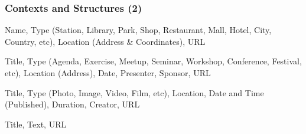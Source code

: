 \documentclass[10pt, compress]{beamer}
\begin{document}
\begin{frame}[fragile]
  \frametitle{Contexts and Structures (2)}

  \begin{description} \itemsep0pt
    \item[Place] Name, Type (Station, Library, Park, Shop, Restaurant, Mall, Hotel, City, Country, etc), Location (Address \& Coordinates), URL
    \item[Event] Title, Type (Agenda, Exercise, Meetup, Seminar, Workshop, Conference, Festival, etc), Location (Address), Date, Presenter, Sponsor, URL
    \item[Multimedia] Title, Type (Photo, Image, Video, Film, etc), Location, Date and Time (Published), Duration, Creator, URL
    \item[Miscellaneous] Title, Text, URL
  \end{description}

\end{frame}



\end{document}
